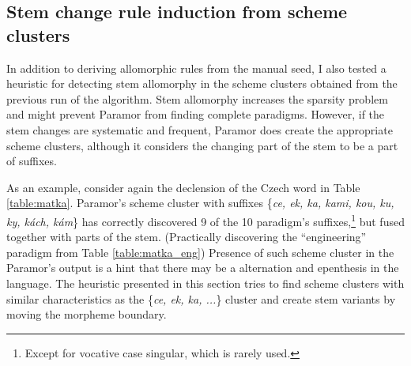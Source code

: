 \subsection{Stem change rule induction from scheme clusters}\label{section:autoseed}

\noindent
In addition to deriving allomorphic rules from the manual seed, I also tested a heuristic for detecting stem allomorphy in the scheme clusters obtained from the previous run of the algorithm.
%
Stem allomorphy increases the sparsity problem and might prevent Paramor from finding complete paradigms. However, if the stem changes are systematic and frequent, Paramor does create the appropriate scheme clusters, although it considers the changing part of the stem to be a part of suffixes.

As an example, consider again the declension of the Czech word  in Table \ref{table:matka}. Paramor's scheme cluster with suffixes \{\emph{ce, ek, ka, kami, kou, ku, ky, kách, kám}\} has correctly discovered 9 of the 10 paradigm's suffixes,\footnote{Except for vocative case singular, which is rarely used.} but fused together with parts of the stem. (Practically discovering the ``engineering'' paradigm from Table \ref{table:matka_eng})
Presence of such scheme cluster in the Paramor's output is a hint that there may be a  alternation and epenthesis in the language. The heuristic presented in this section tries to find scheme clusters with similar characteristics as the \{\emph{ce, ek, ka, ...}\} cluster and create stem variants by moving the morpheme boundary.

